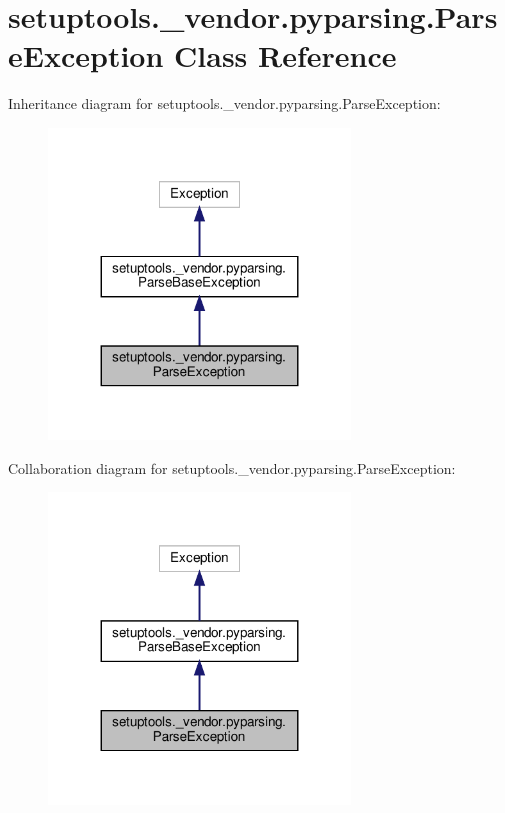 \hypertarget{classsetuptools_1_1__vendor_1_1pyparsing_1_1ParseException}{}\section{setuptools.\+\_\+vendor.\+pyparsing.\+Parse\+Exception Class Reference}
\label{classsetuptools_1_1__vendor_1_1pyparsing_1_1ParseException}


Inheritance diagram for setuptools.\+\_\+vendor.\+pyparsing.\+Parse\+Exception\+:
\nopagebreak
\begin{figure}[H]
\begin{center}
\leavevmode
\includegraphics[width=227pt]{classsetuptools_1_1__vendor_1_1pyparsing_1_1ParseException__inherit__graph}
\end{center}
\end{figure}


Collaboration diagram for setuptools.\+\_\+vendor.\+pyparsing.\+Parse\+Exception\+:
\nopagebreak
\begin{figure}[H]
\begin{center}
\leavevmode
\includegraphics[width=227pt]{classsetuptools_1_1__vendor_1_1pyparsing_1_1ParseException__coll__graph}
\end{center}
\end{figure}
